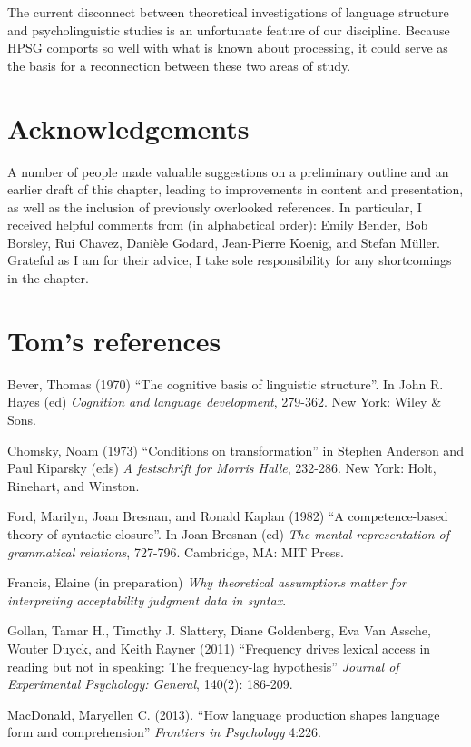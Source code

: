 \documentclass[a4paper]{article}
\begin{document}
The current disconnect between theoretical investigations of language structure and psycholinguistic studies is an unfortunate feature of our discipline.  Because HPSG comports so well with what is known about processing, it could serve as the basis for a reconnection between these two areas of study.

\section*{Acknowledgements}

A number of people made valuable suggestions on a preliminary outline and an earlier draft of this
chapter, leading to improvements in content and presentation, as well as the inclusion of previously
overlooked references.  In particular, I received helpful comments from (in alphabetical order):
Emily Bender, Bob Borsley, Rui Chavez, Danièle Godard, Jean-Pierre Koenig, and Stefan Müller.
Grateful as I am for their advice, I take sole responsibility for any shortcomings in the chapter. 


\section*{Tom's references}

Bever, Thomas (1970) ``The cognitive basis of linguistic structure''.  In John R. Hayes (ed) \emph{Cognition and language development}, 279-362.  New York: Wiley \& Sons.

Chomsky, Noam (1973) ``Conditions on transformation'' in Stephen Anderson and Paul Kiparsky (eds) \emph{A festschrift for Morris Halle}, 232-286.  New York: Holt, Rinehart, and Winston.

Ford, Marilyn, Joan Bresnan, and Ronald Kaplan (1982) ``A competence-based theory of syntactic closure''.  In Joan Bresnan (ed) \emph{The mental representation of grammatical relations}, 727-796.  Cambridge, MA: MIT Press.

Francis, Elaine (in preparation) \emph{Why theoretical assumptions matter for interpreting
acceptability judgment data in syntax}.

Gollan, Tamar H., Timothy J. Slattery, Diane Goldenberg, Eva Van Assche, Wouter Duyck, and Keith Rayner (2011) ``Frequency drives lexical access in reading but not in speaking:  The frequency-lag hypothesis''  \emph{Journal of Experimental Psychology:  General}, 140(2): 186-209.

MacDonald, Maryellen C. (2013). ``How language production shapes language form and comprehension'' \emph{Frontiers in Psychology} 4:226. 
\end{document}
